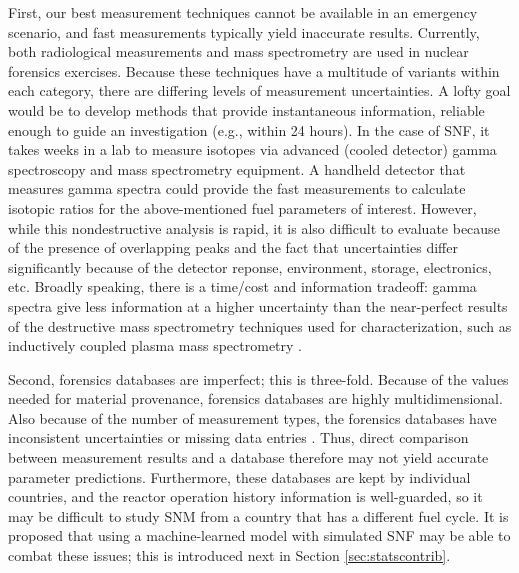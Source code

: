 First, our best measurement techniques cannot be available in an emergency
scenario, and fast measurements typically yield inaccurate results.  Currently,
both radiological measurements and mass spectrometry are used in nuclear
forensics exercises.  Because these techniques have a multitude of variants
within each category, there are differing levels of measurement uncertainties.
A lofty goal would be to develop methods that provide instantaneous
information, reliable enough to guide an investigation (e.g., within 24 hours).
In the case of \gls{SNF}, it takes weeks in a lab to measure isotopes via
advanced (cooled detector) gamma spectroscopy and mass spectrometry equipment.
A handheld detector that measures gamma spectra could provide the fast
measurements to calculate isotopic ratios for the above-mentioned fuel
parameters of interest.  However, while this nondestructive analysis is rapid,
it is also difficult to evaluate because of the presence of overlapping peaks
and the fact that uncertainties differ significantly because of the detector
reponse, environment, storage, electronics, etc. Broadly speaking, there is a
time/cost and information tradeoff: gamma spectra give less information at a
higher uncertainty than the near-perfect results of the destructive mass
spectrometry techniques used for characterization, such as inductively coupled
plasma mass spectrometry \cite{iaea_nf}.

Second, forensics databases are imperfect; this is three-fold.  Because of the
values needed for material provenance, forensics databases are highly
multidimensional. Also because of the number of measurement types, the
forensics databases have inconsistent uncertainties or missing data entries
\cite{nf_missingdata}.  Thus, direct comparison between measurement results and
a database therefore may not yield accurate parameter predictions.
Furthermore, these databases are kept by individual countries, and the reactor
operation history information is well-guarded, so it may be difficult to study
\gls{SNM} from a country that has a different fuel cycle.  It is proposed that
using a machine-learned model with simulated \gls{SNF} may be able to combat
these issues; this is introduced next in Section \ref{sec:statscontrib}. 
